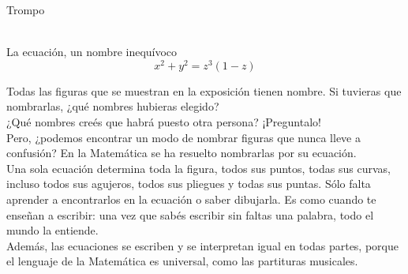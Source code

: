 \documentclass[es]{../../common/SurferDesc}%
\begin{document}
\footnotesize

 

\begin{surferPage}
  \begin{surferTitle}Trompo\end{surferTitle}  \\
La ecuaci\'on, un nombre inequ\'ivoco\\
\smallskip
\[x^2 + y^2	= z^3	(1 - z) \]

\vspace{0.3cm}
Todas las figuras que se muestran en la exposici\'on tienen nombre. Si tuvieras que nombrarlas, ¿qu\'e nombres hubieras elegido?\\
\vspace{0.3cm}
¿Qu\'e nombres cre\'es que habr\'a puesto otra persona? ¡Preguntalo!\\
\vspace{0.3cm}
Pero, ¿podemos encontrar un modo de nombrar figuras que nunca lleve a confusi\'on? En la Matem\'atica se ha resuelto nombrarlas por su ecuaci\'on.\\
\vspace{0.3cm}
Una sola ecuaci\'on determina toda la figura, todos sus puntos, todas sus curvas, incluso todos sus agujeros, todos sus pliegues y todas sus puntas. S\'olo falta aprender a encontrarlos en la ecuaci\'on o saber dibujarla. Es como cuando te enseñan a escribir: una vez que sab\'es escribir sin faltas una palabra, todo el mundo la entiende.\\
\vspace{0.3cm}
Adem\'as, las ecuaciones se escriben y se interpretan igual en todas partes, porque el lenguaje de la Matem\'atica es universal, como las partituras musicales.

  \begin{surferText}
     \end{surferText}
\end{surferPage}
\end{document}
